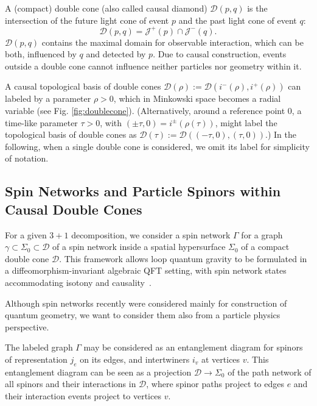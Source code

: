 \documentclass[11pt,a4paper]{article}
\theoremstyle{definition}
\begin{document}
	A (compact) double cone (also called causal diamond) $\mathcal{D}(p,q)$ is the intersection of the future light cone of event $p$ and the past light cone of event $q$:
	\begin{equation}
		\mathcal{D}(p,q) = \mathcal{J}^+(p) \cap \mathcal{J}^-(q) .
		\label{eq:double_cone}
	\end{equation}
	$\mathcal{D}(p,q)$ contains the maximal domain for observable interaction, which can be both, influenced by $q$ and detected by $p$. Due to causal construction, events outside a double cone cannot influence neither particles nor geometry within it.
	
	
	A causal topological basis of double cones $\mathcal{D}(\rho):=\mathcal{D}(i^-(\rho),i^+(\rho))$  can labeled by a parameter $\rho>0$, which in Minkowski space becomes a radial variable (see Fig. \ref{fig:doublecone}).
	(Alternatively, around a reference point $0$, a time-like parameter $\tau>0$, with $(\pm\tau,0)=i^\pm(\rho(\tau))$, might label the topological basis of double cones as
	$\mathcal{D}(\tau):=\mathcal{D}((-\tau,0),(\tau,0))$.) In the following, when a single double cone is considered, we omit its label for simplicity of notation.
	
	
	
	\subsection{Spin Networks and Particle Spinors within Causal Double Cones}
	For a given $3+1$ decomposition, we consider a spin network $\Gamma$ for a graph $\gamma\subset\Sigma_0\subset \mathcal{D}$ of a spin network inside a spatial  hypersurface $\Sigma_0$ of a compact double cone $\mathcal{D}$. 
	This framework allows loop quantum gravity to be formulated in a diffeomorphism-invariant algebraic QFT setting, with spin network states accommodating isotony and causality~\cite{rainer2000lqg}.
	
	Although spin networks recently were considered mainly for construction of quantum geometry, we want to consider them also
	from a particle physics perspective. 
	
	The labeled graph $\Gamma$ may be considered as an entanglement diagram for spinors of representation $j_e$
	on its edges, and intertwiners $i_v$  at vertices $v$.
	This entanglement diagram can be seen as a  projection $\mathcal{D}\rightarrow \Sigma_0$ of the path network of all spinors and their interactions in $\mathcal{D}$, where spinor paths project to edges $e$ and their interaction events project to vertices $v$. 
	
\end{document}
